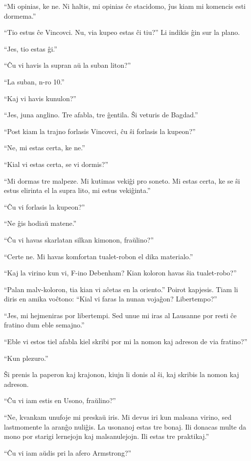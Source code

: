 ``Mi opinias, ke ne. Ni haltis, mi opinias ĉe stacidomo, ĵus kiam mi komencis esti dormema.''

``Tio estus ĉe Vincovci. Nu, via kupeo estas ĉi tiu?'' Li indikis ĝin sur la plano.

``Jes, tio estas ĝi.''

``Ĉu vi havis la supran aŭ la suban liton?''

``La suban, n-ro 10.''

``Kaj vi havis kunulon?''

``Jes, juna anglino. Tre afabla, tre ĝentila. Ŝi veturis de Bagdad.''

``Post kiam la trajno forlasis Vincovci, ĉu ŝi forlasis la kupeon?''

``Ne, mi estas certa, ke ne.''

``Kial vi estas certa, se vi dormis?''

``Mi dormas tre malpeze. Mi kutimas vekiĝi pro soneto. Mi estas certa, ke se ŝi estus elirinta el la supra lito, mi estus vekiĝinta.''

``Ĉu vi forlasis la kupeon?''

``Ne ĝis hodiaŭ matene.''

``Ĉu vi havas skarlatan silkan kimonon, fraŭlino?''

``Certe ne. Mi havas komfortan tualet-robon el dika materialo.''

``Kaj la virino kun vi, F-ino Debenham? Kian koloron havas ŝia tualet-robo?''

``Palan malv-koloron, tia kian vi aĉetas en la oriento.'' Poirot kapjesis. Tiam li diris en amika voĉtono: ``Kial vi faras la nunan vojaĝon? Libertempo?''

``Jes, mi hejmeniras por libertempi. Sed unue mi iras al Lausanne por resti ĉe fratino dum eble semajno.''

``Eble vi estos tiel afabla kiel skribi por mi la nomon kaj adreson de via fratino?''

``Kun plezuro.''

Ŝi prenis la paperon kaj krajonon, kiujn li donis al ŝi, kaj skribis la nomon kaj adreson.

``Ĉu vi iam estis en Usono, fraŭlino?''

``Ne, kvankam unufoje mi preskaŭ iris. Mi devus iri kun malsana virino, sed lastmomente la aranĝo nuliĝis. La usonanoj estas tre bonaj. Ili donacas multe da mono por starigi lernejojn kaj malsanulejojn. Ili estas tre praktikaj.''

``Ĉu vi iam aŭdis pri la afero Armstrong?''

